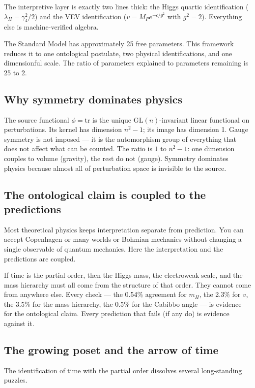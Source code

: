 \documentclass[11pt,letterpaper]{article}
\theoremstyle{remark}
\begin{document}
The interpretive layer is exactly two lines thick: the Higgs quartic
identification ($\lambda_H = \gamma_4^2/2$) and the VEV
identification ($v = M_P e^{-c/g^2}$ with $g^2 = 2$). Everything
else is machine-verified algebra.

The Standard Model has approximately 25 free parameters. This
framework reduces it to one ontological postulate, two physical
identifications, and one dimensionful scale. The ratio of parameters
explained to parameters remaining is 25 to 2.

\subsection{Why symmetry dominates physics}

The source functional $\phi = \mathrm{tr}$ is the unique $\mathrm{GL}(n)$-invariant linear functional on perturbations. Its kernel
has dimension $n^2 - 1$; its image has dimension 1. Gauge symmetry
is not imposed — it is the automorphism group of everything
that does not affect what can be counted. The ratio is $1$ to
$n^2 - 1$: one dimension couples to volume (gravity), the rest do not
(gauge). Symmetry dominates physics because almost all of
perturbation space is invisible to the source.

\subsection{The ontological claim is coupled to the predictions}

Most theoretical physics keeps interpretation separate from
prediction. You can accept Copenhagen or many worlds or Bohmian
mechanics without changing a single observable of quantum mechanics.
Here the interpretation and the predictions are coupled.

If time is the partial order, then the Higgs mass, the electroweak
scale, and the mass hierarchy must all come from the structure of
that order. They cannot come from anywhere else. Every check — the
0.54\% agreement for $m_H$, the 2.3\% for $v$, the 3.5\% for the
mass hierarchy, the 0.5\% for the Cabibbo angle — is evidence for
the ontological claim. Every prediction that fails (if any do) is
evidence against it.

\subsection{The growing poset and the arrow of time}

The identification of time with the partial order dissolves several
long-standing puzzles.
\end{document}

